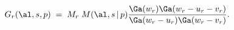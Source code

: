 \begin{equation}\label{F-zwei}
G_r(\al,s,p)\;=\;M_r \;M(\al,s\,|\,p)
\frac{\Ga(w_r)\Ga(w_r-u_r-v_r)}{\Ga(w_r-u_r)\Ga(w_r-v_r)}.
\end{equation}

